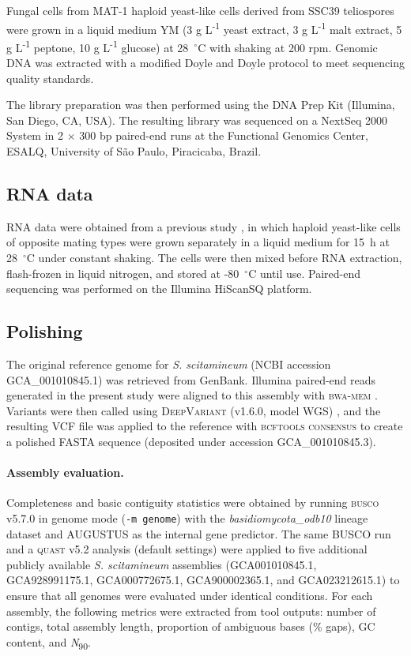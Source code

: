 \documentclass[Journal,letterpaper]{theme}
\begin{document}
Fungal cells from MAT-1 haploid yeast-like cells derived from SSC39
teliospores were grown in a liquid medium YM (3 g
  L\textsuperscript{-1} yeast extract, 3 g L\textsuperscript{-1} malt
  extract, 5 g L\textsuperscript{-1} peptone, 10 g
L\textsuperscript{-1} glucose) at 28~$^{\circ}$C with shaking at 200
rpm. Genomic DNA was extracted with a modified Doyle and Doyle
protocol \cite{Doyle1987} to meet sequencing quality standards.

The library preparation was then performed using the DNA Prep Kit
(Illumina, San Diego, CA, USA). The resulting library was sequenced
on a NextSeq 2000 System in 2 $\times$ 300 bp paired-end runs at the
Functional Genomics Center, ESALQ, University of São Paulo, Piracicaba, Brazil.

\subsection*{RNA data}

RNA data were obtained from a previous study \cite{sscita2015}, in
which haploid yeast-like cells of opposite mating types were grown
separately in a liquid medium for 15~h at 28~$^{\circ}$C under
constant shaking. The cells were then mixed before RNA extraction,
flash-frozen in liquid nitrogen, and stored at -80~$^{\circ}$C until
use. Paired-end sequencing was performed on the Illumina HiScanSQ platform.

\subsection*{Polishing}

The original reference genome for \textit{S. scitamineum} (NCBI
accession GCA\_001010845.1) \cite{sscita2015} was retrieved from
GenBank. Illumina paired-end reads generated in the present study
were aligned to this assembly with \textsc{bwa-mem} \cite{bwamem}.
Variants were then called using \textsc{DeepVariant} (v1.6.0, model
WGS) \cite{deepvariant2018}, and the resulting VCF file was
applied to the reference with \textsc{bcftools consensus}
\cite{samtools} to create a polished FASTA sequence (deposited under
accession GCA\_001010845.3).

\paragraph{Assembly evaluation.} Completeness and basic contiguity
statistics were obtained by running \textsc{busco} v5.7.0
\cite{busco} in genome mode (\texttt{-m genome}) with the
\textit{basidiomycota\_odb10} lineage dataset and \textsc{AUGUSTUS}
as the internal gene predictor. The same BUSCO run and a
\textsc{quast} v5.2 analysis (default settings) were applied to five
additional publicly available \textit{S. scitamineum} assemblies
(GCA001010845.1, GCA928991175.1, GCA000772675.1, GCA900002365.1, and
GCA023212615.1) to ensure that all genomes were evaluated under
identical conditions. For each assembly, the following metrics were
extracted from tool outputs: number of contigs, total assembly
length, proportion of ambiguous bases (\% gaps), GC content, and
\textit{N}\textsubscript{90}.
\end{document}
